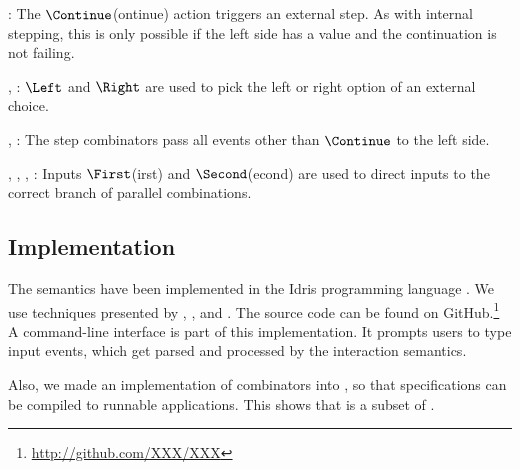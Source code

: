 :
The $\Continue$(ontinue) action triggers an external step.
As with internal stepping, this is only possible if the left side has a value and the continuation is not failing.

,
:
$\Left$ and $\Right$ are used to pick the left or right option of an external choice.

,
:
The step combinators pass all events other than $\Continue$ to the left side.

,
,
,
:
Inputs $\First$(irst) and $\Second$(econd) are used to direct inputs to the correct branch of parallel combinations.



\subsection{Implementation}

The semantics have been implemented in the Idris programming language \cite{journals/jfp/Brady13}.
We use techniques presented by \textcite{journals/entcs/JaskelioffGH11}, \textcite{journals/jfp/Swierstra08}, and \textcite{school/maktoberdorf/PeytonJones01}.
The source code can be found on GitHub.\footnote{\url{http://github.com/XXX/XXX}}
A command-line interface is part of this implementation.
It prompts users to type input events, which get parsed and processed by the interaction semantics.

Also, we made an implementation of \TOPHAT combinators into \ITASKS,
so that \TOPHAT specifications can be compiled to runnable applications.
This shows that \TOPHAT is a subset of \ITASKS.
